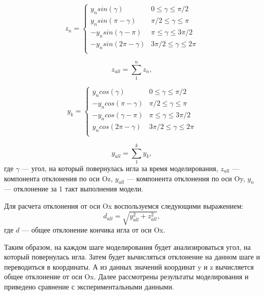 \documentclass[10pt]{article}
\begin{document}
\begin{equation} \label{eq7}
z_{n} = 
 \begin{cases}
   y_{n} sin(\gamma) &{ 0 \leq \gamma \leq \pi/2 }\\
   y_{n} sin(\pi - \gamma) &{ \pi/2 \leq \gamma \leq \pi }\\
  - y_{n} sin( \gamma - \pi) &{ \pi \leq \gamma \leq 3\pi/2 }\\
   - y_{n} sin(2\pi -  \gamma) &{ 3\pi/2 \leq \gamma \leq 2\pi }\\
 \end{cases}
\end{equation}

\begin{equation} \label{eq8}
z_{all} = \sum\limits_{1}^{n} z_{n},
\end{equation}

\begin{equation} \label{eq9}
y_{k} = 
 \begin{cases}
   y_{n} cos(\gamma) &{ 0 \leq \gamma \leq \pi/2 }\\
   - y_{n} cos(\pi - \gamma) &{ \pi/2 \leq \gamma \leq \pi }\\
  - y_{n} cos( \gamma - \pi) &{ \pi \leq \gamma \leq 3\pi/2 }\\
    y_{n} cos(2\pi -  \gamma) &{ 3\pi/2 \leq \gamma \leq 2\pi }\\
 \end{cases}
\end{equation}

\begin{equation} \label{eq10}
y_{all} = \sum\limits_{1}^{k} y_{k},
\end{equation}
где $\gamma$ --- угол, на который повернулась игла за время моделирования, $z_{all} $ --- компонента отклонения по оси Oz, $y_{all}$ --- компонента отклонения по оси Oy, $y_{n}$ --- отклонение за 1 такт выполнения модели.

Для расчета отклонения от оси Ox воспользуемся следующими выражением:
\begin{equation} \label{eq11}
d_{all} = \sqrt{y_{all}^2  +  z_{all} ^2},
\end{equation}
где $d$ --- общее отклонение кончика игла от оси Ox.

Таким образом, на каждом шаге моделирования будет анализироваться угол, на который повернулась игла. Затем будет вычисляться отклонение на данном шаге и переводиться в координаты. А из данных значений координат y и z вычисляется общее отклонение от оси Ox.
Далее рассмотрены результаты моделирования и приведено сравнение с экспериментальными данными.
\end{document}
